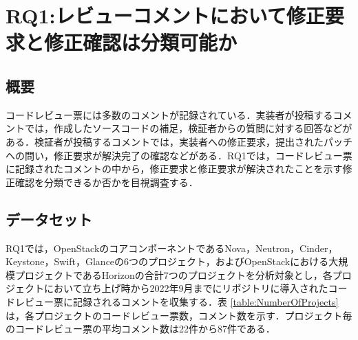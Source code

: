 \documentclass[T,J]{fose} %
\newcommand{\RQOne}{レビューコメントにおいて修正要求と修正確認は分類可能か}
\begin{document}
\section{RQ1:\RQOne}\label{sec:RQ1}

\subsection{概要}
コードレビュー票には多数のコメントが記録されている．実装者が投稿するコメントでは，作成したソースコードの補足，検証者からの質問に対する回答などがある．検証者が投稿するコメントでは，実装者への修正要求，提出されたパッチへの問い，修正要求が解決完了の確認などがある．RQ1では，コードレビュー票に記録されたコメントの中から，修正要求と修正要求が解決されたことを示す修正確認を分類できるか否かを目視調査する．


\subsection{データセット}
RQ1では，OpenStackのコアコンポーネントであるNova，Neutron，Cinder，Keystone，Swift，Glanceの6つのプロジェクト，およびOpenStackにおける大規模プロジェクトであるHorizonの合計7つのプロジェクトを分析対象とし，各プロジェクトにおいて立ち上げ時から2022年9月までにリポジトリに導入されたコードレビュー票に記録されるコメントを収集する．表
\ref{table:NumberOfProjects}は，各プロジェクトのコードレビュー票数，コメント数を示す．プロジェクト毎のコードレビュー票の平均コメント数は22件から87件である．

\begin{table}[t]
\centering
  \caption{各プロジェクトにおいて導入されたコードレビュー票数とコメント数}
  \label{table:NumberOfProjects}
\end{table}
\end{document}
